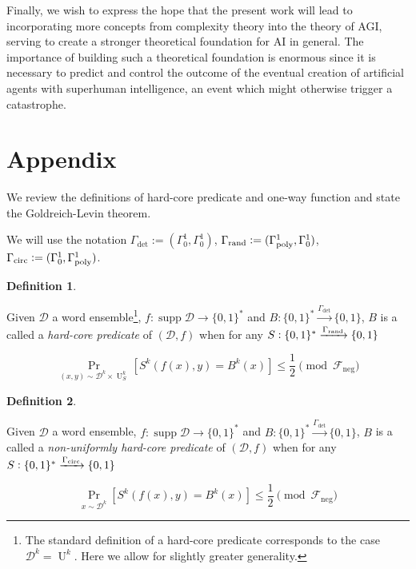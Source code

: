 \documentclass{article}
\numberwithin{equation}{section}
\theoremstyle{definition}
\newtheorem{definition}{Definition}[section]
\theoremstyle{plain}
\newcommand{\Bool}{\{0,1\}}
\newcommand{\Words}{{\Bool^*}}
\DeclareMathOperator{\Supp}{supp}
\DeclareMathOperator{\Prb}{Pr}
\DeclareMathOperator{\Un}{U}
\newcommand{\Dist}{\mathcal{D}}
\newcommand{\Fall}{\mathcal{F}}
\newcommand{\GammaPoly}{\Gamma_{\textnormal{poly}}}
\begin{document}
Finally, we wish to express the hope that the present work will lead to incorporating more concepts from complexity theory into the theory of AGI, serving to create a stronger theoretical foundation for AI in general. The importance of building such a theoretical foundation is enormous since it is necessary to predict and control the outcome of the eventual creation of artificial agents with superhuman intelligence, an event which might otherwise trigger a catastrophe\cite{Bostrom_2014}.


\appendix

\section{Appendix}

We review the definitions of hard-core predicate and one-way function and state the Goldreich-Levin theorem.

We will use the notation $\Gamma_{\text{det}}:=(\Gamma_0^1,\Gamma_0^1)$, $\Gamma_{\text{rand}}:=(\GammaPoly^1,\Gamma_0^1)$, ${\Gamma_{\text{circ}}:=(\Gamma_0^1,\GammaPoly^1)}$.

\begin{samepage}
\begin{definition}
\label{def:hard_core}

Given $\Dist$ a word ensemble\footnote{The standard definition of a hard-core predicate corresponds to the case $\Dist^k=\Un^k$. Here we allow for slightly greater generality.}, $f: \Supp \Dist \rightarrow \Words$ and ${B: \Words \xrightarrow{\Gamma_{\text{det}}} \Bool}$, $B$ is a called a \emph{hard-core predicate} of $(\Dist,f)$ when for any $S: \Words \xrightarrow{\Gamma_{\textnormal{rand}}} \Bool$

\begin{equation}
\Prb_{(x,y) \sim \Dist^k \times \Un_S^k}[S^k(f(x),y)=B^k(x)] \leq \frac{1}{2} \pmod {\Fall_{\text{neg}}}
\end{equation}

\end{definition}
\end{samepage}

\begin{samepage}
\begin{definition}
\label{def:hard_core_adv}

Given $\Dist$ a word ensemble, $f: \Supp \Dist \rightarrow \Words$ and ${B: \Words \xrightarrow{\Gamma_{\text{det}}} \Bool}$, $B$ is a called a \emph{non-uniformly hard-core predicate} of $(\Dist,f)$ when for any ${S: \Words \xrightarrow{\Gamma_{\textnormal{circ}}} \Bool}$ 

\begin{equation}
\Prb_{x \sim \Dist^k}[S^k(f(x),y)=B^k(x)] \leq \frac{1}{2} \pmod {\Fall_{\text{neg}}}
\end{equation}

\end{definition}
\end{samepage}
\end{document}
